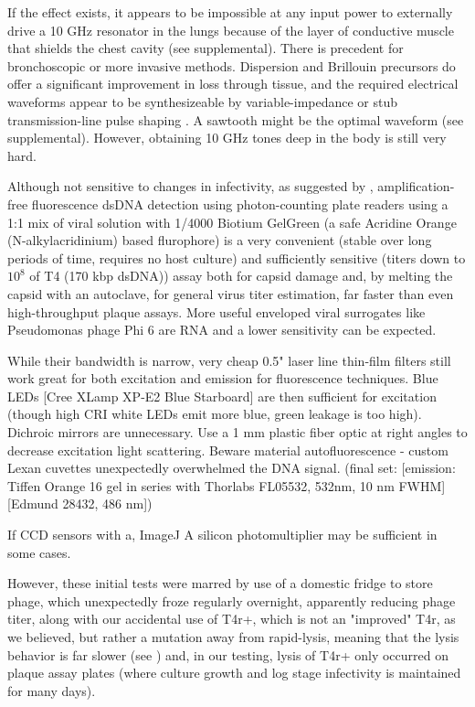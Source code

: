 \documentclass[paper.tex]{subfiles}
\begin{document}
If the effect exists, it appears to be impossible at any input power to externally drive a 10 GHz resonator in the lungs because of the layer of conductive muscle that shields the chest cavity (see supplemental). There is precedent for bronchoscopic \cite{Flexible2019}\cite{Antenna2018} or more invasive methods. Dispersion and Brillouin precursors do offer a significant improvement in loss through tissue, and the required electrical waveforms appear to be synthesizeable by variable-impedance or stub transmission-line pulse shaping\cite{Arbitrarya} . A sawtooth might be the optimal waveform (see supplemental). However, obtaining 10 GHz tones deep in the body is still very hard.

Although not sensitive to changes in infectivity, as suggested by \cite{Quantification2020}, amplification-free fluorescence dsDNA detection using photon-counting plate readers using a 1:1 mix of viral solution with 1/4000 Biotium GelGreen (a safe Acridine Orange (N-alkylacridinium) based flurophore) is a very convenient (stable over long periods of time, requires no host culture) and sufficiently sensitive (titers down to $10^8$ of T4 (170 kbp dsDNA)) assay both for capsid damage and, by melting the capsid with an autoclave, for general virus titer estimation, far faster than even high-throughput plaque assays. More useful enveloped viral surrogates like Pseudomonas phage Phi 6 are RNA and a lower sensitivity can be expected. 

While their bandwidth is narrow, very cheap 0.5" laser line thin-film filters still work great for both excitation and emission for fluorescence techniques. Blue LEDs [Cree XLamp XP-E2 Blue Starboard] are then sufficient for excitation (though high CRI white LEDs emit more blue, green leakage is too high). Dichroic mirrors are unnecessary. Use a 1 mm plastic fiber optic at right angles to decrease excitation light scattering. Beware material autofluorescence - custom Lexan cuvettes unexpectedly overwhelmed the DNA signal. (final set: [emission: Tiffen Orange 16 gel in series with Thorlabs FL05532, 532nm, 10 nm FWHM] [Edmund 28432, 486 nm])

If CCD sensors with a, ImageJ \cite{Image2012} A silicon photomultiplier may be sufficient in some cases.

However, these initial tests were marred by use of a domestic fridge to store phage, which unexpectedly froze regularly overnight, apparently reducing phage titer, along with our accidental use of T4r+, which is not an "improved" T4r, as we believed, but rather a mutation away from rapid-lysis, meaning that the lysis behavior is far slower (see \cite{Spontaneous1946}) and, in our testing, lysis of T4r+ only occurred on plaque assay plates (where culture growth and log stage infectivity is maintained for many days). 
\end{document}
